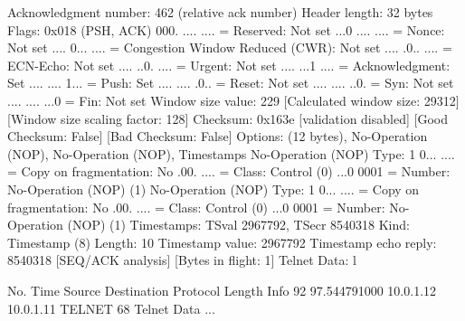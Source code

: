     Acknowledgment number: 462    (relative ack number)
    Header length: 32 bytes
    Flags: 0x018 (PSH, ACK)
        000. .... .... = Reserved: Not set
        ...0 .... .... = Nonce: Not set
        .... 0... .... = Congestion Window Reduced (CWR): Not set
        .... .0.. .... = ECN-Echo: Not set
        .... ..0. .... = Urgent: Not set
        .... ...1 .... = Acknowledgment: Set
        .... .... 1... = Push: Set
        .... .... .0.. = Reset: Not set
        .... .... ..0. = Syn: Not set
        .... .... ...0 = Fin: Not set
    Window size value: 229
    [Calculated window size: 29312]
    [Window size scaling factor: 128]
    Checksum: 0x163e [validation disabled]
        [Good Checksum: False]
        [Bad Checksum: False]
    Options: (12 bytes), No-Operation (NOP), No-Operation (NOP), Timestamps
        No-Operation (NOP)
            Type: 1
                0... .... = Copy on fragmentation: No
                .00. .... = Class: Control (0)
                ...0 0001 = Number: No-Operation (NOP) (1)
        No-Operation (NOP)
            Type: 1
                0... .... = Copy on fragmentation: No
                .00. .... = Class: Control (0)
                ...0 0001 = Number: No-Operation (NOP) (1)
        Timestamps: TSval 2967792, TSecr 8540318
            Kind: Timestamp (8)
            Length: 10
            Timestamp value: 2967792
            Timestamp echo reply: 8540318
    [SEQ/ACK analysis]
        [Bytes in flight: 1]
Telnet
    Data: l

No.     Time           Source                Destination           Protocol Length Info
     92 97.544791000   10.0.1.12             10.0.1.11             TELNET   68     Telnet Data ...

